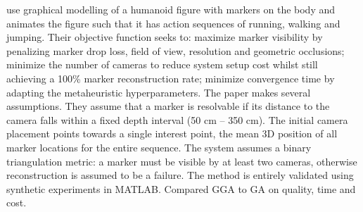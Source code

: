 \citet{aissaoui2018designing} use graphical modelling of a humanoid figure with markers on the body and animates the figure such that it has action sequences of running, walking and jumping.
Their objective function seeks to: maximize marker visibility by penalizing marker drop loss, field of view, resolution and geometric occlusions; minimize the number of cameras to reduce system setup cost whilst still achieving a 100\% marker reconstruction rate; minimize convergence time by adapting the metaheuristic hyperparameters.
The paper makes several assumptions. They assume that a marker is resolvable if its distance to the camera falls within a fixed depth interval (50 cm -- 350 cm). The initial camera placement points towards a single interest point, the mean 3D position of all marker locations for the entire sequence. The system assumes a binary triangulation metric: a marker must be visible by at least two cameras, otherwise reconstruction is assumed to be a failure.
The method is entirely validated using synthetic experiments in MATLAB.
Compared GGA to GA on quality, time and cost.

